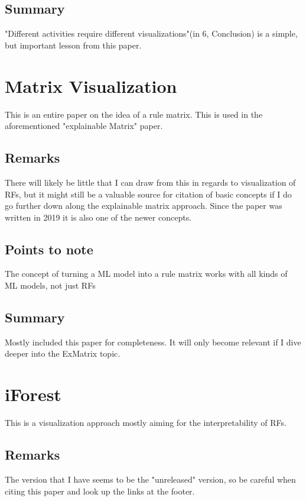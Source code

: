 \documentclass[a4paper, 12pt]{article}
\begin{document}
\subsection{Summary}
"Different activities require different visualizations"(in 6, Conclusion) is a simple, but important lesson from
this paper.

\section{Matrix Visualization}
This \cite{ming2018rulematrix} is an entire paper on the idea of a rule matrix. This is used in the aforementioned
"explainable Matrix" paper.
\subsection{Remarks}
There will likely be little that I can draw from this in regards to visualization of RFs, but it might still be a
valuable source for citation of basic concepts if I do go further down along the explainable matrix approach.
Since the paper was written in 2019 it is also one of the newer concepts.
\subsection{Points to note}
\begin{description}[font=$\bullet$~\normalfont]
        \item[Not specific to RFs:]The concept of turning a ML model into a rule matrix works with all kinds of ML
        models, not just RFs
\end{description}
\subsection{Summary}
Mostly included this paper for completeness. It will only become relevant if I dive deeper into the ExMatrix topic.

\section{iForest}
This \cite{zhao2018iforest} is a visualization approach mostly aiming for the interpretability of RFs.

\subsection{Remarks}
The version that I have seems to be the "unreleased" version, so be careful when citing this paper and look up the
links at the footer.
\end{document}
